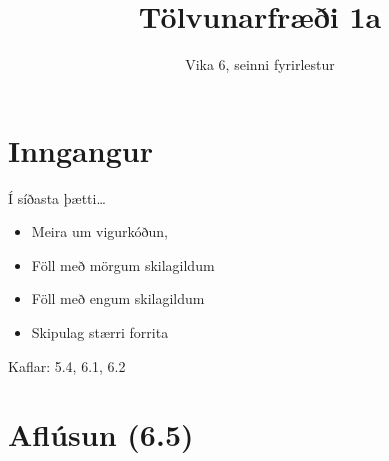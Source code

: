 \documentclass{beamer}
\title{Tölvunarfræði 1a}
\subtitle{Vika 6, seinni fyrirlestur}
\begin{document}
\begin{frame}
\titlepage
\end{frame}

\section{Inngangur}

\begin{frame}{Í síðasta þætti\ldots}
\begin{itemize}
 \item Meira um vigurkóðun, 
 \item Föll með mörgum skilagildum
 \item Föll með engum skilagildum
 \item Skipulag stærri forrita
\end{itemize}
Kaflar: 5.4, 6.1, 6.2
\end{frame}


\section{Aflúsun (6.5)}
\end{document}
